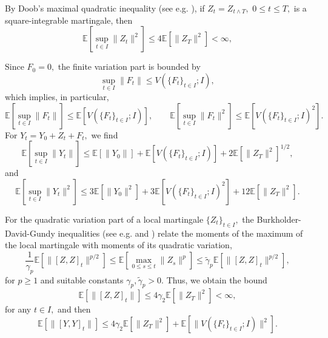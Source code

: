 \documentclass[reqno,12pt]{amsart}
\theoremstyle{plain} %
\theoremstyle{definition} %
\begin{document}
By Doob's maximal quadratic inequality (see e.g. \cite[Theorem I.20]{Protter2005}), if $Z_t = Z_{t \land T},$ $0\leq t \leq T,$ is a square-integrable martingale, then
\begin{equation}
    \label{expectationZtsquaredfinite}
    \mathbb{E}\left[\sup_{t\in I} \|Z_t\|^2\right] \leq 4\mathbb{E}[\|Z_T\|^2] < \infty,
\end{equation}

Since $F_0 = 0,$ the finite variation part is bounded by
\[
    \sup_{t\in I} \|F_t\| \leq V(\{F_t\}_{t\in I}; I),
\]
which implies, in particular,
\[
    \mathbb{E}\left[\sup_{t\in I} \|F_t\|\right] \leq \mathbb{E}\left[V(\{F_t\}_{t\in I}; I)\right], \qquad \mathbb{E}\left[\sup_{t\in I} \|F_t\|^2\right] \leq \mathbb{E}\left[V(\{F_t\}_{t\in I}; I)^2\right].
\]
For $Y_t = Y_0 + Z_t + F_t,$ we find
\begin{equation}
    \label{expectationYtfinite}
    \mathbb{E}\left[\sup_{t\in I} \|Y_t\|\right] \leq \mathbb{E}[\|Y_0\|] + \mathbb{E}\left[V(\{F_t\}_{t\in I}; I)\right] + 2\mathbb{E}\left[\|Z_T\|^2\right]^{1/2},
\end{equation}
and
\begin{equation}
    \label{expectationYtsquaredfinite}
    \mathbb{E}\left[\sup_{t\in I} \|Y_t\|^2\right] \leq 3\mathbb{E}[\|Y_0\|^2] + 3\mathbb{E}\left[V(\{F_t\}_{t\in I}; I)^2\right] + 12\mathbb{E}[\|Z_T\|^2].
\end{equation}

For the quadratic variation part of a local martingale $\{Z_t\}_{t\in I},$ the Burkholder-David-Gundy inequalities (see e.g. \cite[Theorem IV.48]{Protter2005} and \cite{MARINELLI20161}) relate the moments of the maximum of the local martingale with moments of its quadratic variation,
\[
    \frac{1}{\gamma_p}\mathbb{E}\left[\|[Z, Z]_t\|^{p/2}\right] \leq \mathbb{E}\left[\max_{0\leq s \leq t} \|Z_s\|^p\right] \leq \tilde{\gamma}_p\mathbb{E}\left[\|[Z, Z]_t\|^{p/2}\right],
\]
for $p \geq 1$ and suitable constants $\gamma_p, \tilde{\gamma}_p > 0.$ Thus, we obtain the bound
\begin{equation}
    \label{expectationofquadraticvariationofZ}
    \mathbb{E}\left[\|[Z, Z]_t\|\right] \leq 4\gamma_2\mathbb{E}\left[\|Z_T\|^2\right] < \infty,
\end{equation}
for any $t\in I,$ and then
\begin{equation}
    \label{expectationofquadraticvariation}
    \mathbb{E}\left[\|[Y, Y]_t\|\right] \leq 4\gamma_2\mathbb{E}\left[\|Z_T\|^2\right] + \mathbb{E}\left[\|V(\{F_t\}_{t\in I}; I)\|^2\right].
\end{equation}
\end{document}
